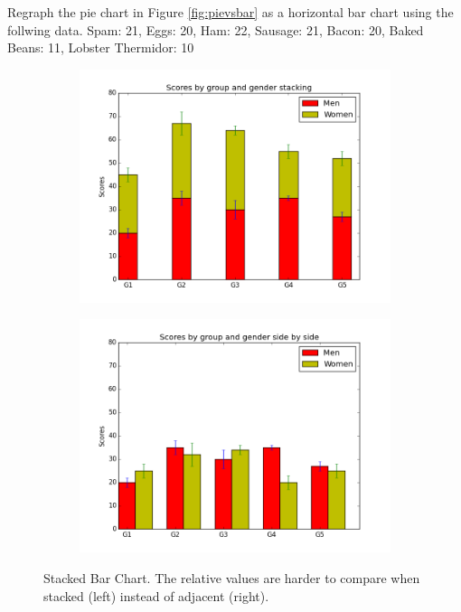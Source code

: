 \begin{problem} %
Regraph the pie chart in Figure \ref{fig:pievsbar} as a horizontal bar chart using the follwing data.
Spam: 21, Eggs: 20, Ham: 22, Sausage: 21, Bacon: 20, Baked Beans: 11, Lobster Thermidor: 10
\end{problem}

\begin{figure}[H] %
\centering
\begin{subfigure}{.45\textwidth}
\centering
\includegraphics[width=\textwidth]{stackedbar.png}
\end{subfigure}
\begin{subfigure}{.45\textwidth}
\centering
\includegraphics[width=\textwidth]{unstackedbar.png}
\end{subfigure}
\caption{Stacked Bar Chart. The relative values are harder to compare when stacked (left) instead of adjacent (right).}
\label{fig:stacked}
\end{figure}

